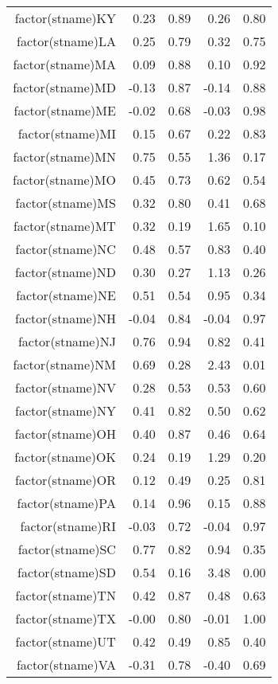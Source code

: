 \begin{table}[ht]
\begin{tabular}{rrrrr}
  factor(stname)KY & 0.23 & 0.89 & 0.26 & 0.80 \\ 
  factor(stname)LA & 0.25 & 0.79 & 0.32 & 0.75 \\ 
  factor(stname)MA & 0.09 & 0.88 & 0.10 & 0.92 \\ 
  factor(stname)MD & -0.13 & 0.87 & -0.14 & 0.88 \\ 
  factor(stname)ME & -0.02 & 0.68 & -0.03 & 0.98 \\ 
  factor(stname)MI & 0.15 & 0.67 & 0.22 & 0.83 \\ 
  factor(stname)MN & 0.75 & 0.55 & 1.36 & 0.17 \\ 
  factor(stname)MO & 0.45 & 0.73 & 0.62 & 0.54 \\ 
  factor(stname)MS & 0.32 & 0.80 & 0.41 & 0.68 \\ 
  factor(stname)MT & 0.32 & 0.19 & 1.65 & 0.10 \\ 
  factor(stname)NC & 0.48 & 0.57 & 0.83 & 0.40 \\ 
  factor(stname)ND & 0.30 & 0.27 & 1.13 & 0.26 \\ 
  factor(stname)NE & 0.51 & 0.54 & 0.95 & 0.34 \\ 
  factor(stname)NH & -0.04 & 0.84 & -0.04 & 0.97 \\ 
  factor(stname)NJ & 0.76 & 0.94 & 0.82 & 0.41 \\ 
  factor(stname)NM & 0.69 & 0.28 & 2.43 & 0.01 \\ 
  factor(stname)NV & 0.28 & 0.53 & 0.53 & 0.60 \\ 
  factor(stname)NY & 0.41 & 0.82 & 0.50 & 0.62 \\ 
  factor(stname)OH & 0.40 & 0.87 & 0.46 & 0.64 \\ 
  factor(stname)OK & 0.24 & 0.19 & 1.29 & 0.20 \\ 
  factor(stname)OR & 0.12 & 0.49 & 0.25 & 0.81 \\ 
  factor(stname)PA & 0.14 & 0.96 & 0.15 & 0.88 \\ 
  factor(stname)RI & -0.03 & 0.72 & -0.04 & 0.97 \\ 
  factor(stname)SC & 0.77 & 0.82 & 0.94 & 0.35 \\ 
  factor(stname)SD & 0.54 & 0.16 & 3.48 & 0.00 \\ 
  factor(stname)TN & 0.42 & 0.87 & 0.48 & 0.63 \\ 
  factor(stname)TX & -0.00 & 0.80 & -0.01 & 1.00 \\ 
  factor(stname)UT & 0.42 & 0.49 & 0.85 & 0.40 \\ 
  factor(stname)VA & -0.31 & 0.78 & -0.40 & 0.69 \\ 

\end{tabular}
\end{table}
